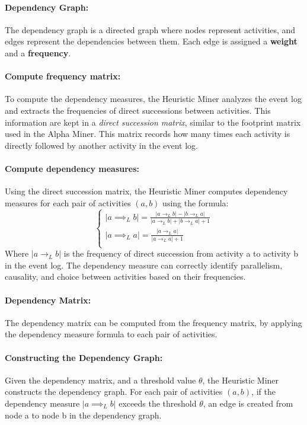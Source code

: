 \paragraph{Dependency Graph:}
The dependency graph is a directed graph where nodes represent activities, and edges represent the dependencies between them.
Each edge is assigned a \textbf{weight} and a \textbf{frequency}.
\paragraph{Compute frequency matrix:}
To compute the dependency measures, the Heuristic Miner analyzes the event log and extracts the frequencies of direct successions between activities.
This information are kept in a \textit{direct succession matrix}, similar to the footprint matrix used in the Alpha Miner.
This matrix records how many times each activity is directly followed by another activity in the event log.
\paragraph{Compute dependency measures:}
Using the direct succession matrix, the Heuristic Miner computes dependency measures for each pair of activities $(a,b)$ using the formula:
\[
\begin{cases}
    |a \implies_L b| = \frac{|a \to_L b| - |b \to_L a|}{|a \to_L b| + |b \to_L a| + 1} \\
    |a \implies_L a| = \frac{|a \to_L a|}{|a \to_L a| + 1} \\
\end{cases}
\]
Where $|a \to_L b|$ is the frequency of direct succession from activity a to activity b in the event log.
The dependency measure can correctly identify parallelism, causality, and choice between activities based on their frequencies.
\paragraph{Dependency Matrix:}
The dependency matrix can be computed from the frequency matrix, by applying the dependency measure formula to each pair of activities.

\paragraph{Constructing the Dependency Graph:}
Given the dependency matrix, and a threshold value $\theta$, the Heuristic Miner constructs the dependency graph.
For each pair of activities $(a,b)$, if the dependency measure $|a \implies_L b|$ exceeds the threshold $\theta$, an edge is created from node a to node b in the dependency graph.

